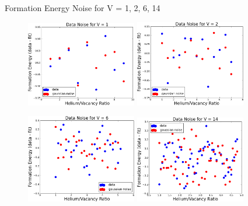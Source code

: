 \documentclass[10pt]{beamer}
\begin{document}
\begin{frame}{Formation Energy Noise for V = 1, 2, 6, 14}
     \begin{figure}
         \includegraphics[width=0.43\textwidth]{V1noise}
         \hspace{4mm}
         \includegraphics[width=0.43\textwidth]{V2noise}
     \end{figure}
     \vspace{-2mm}
     \begin{figure}
         \includegraphics[width=0.43\textwidth]{V6noise}
         \hspace{4mm}
         \includegraphics[width=0.43\textwidth]{V14noise}
     \end{figure}
\end{frame}
\end{document}
